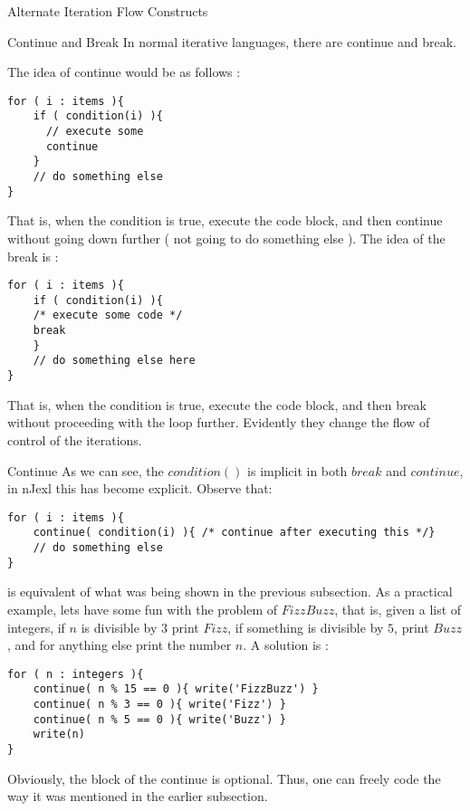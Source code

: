 \begin{section}{Alternate Iteration Flow Constructs}

\begin{subsection}{Continue and Break}
In normal iterative languages, there are continue and break.

The idea of continue would be as follows :
\begin{lstlisting}[style=JexlStyle]
for ( i : items ){
    if ( condition(i) ){
      // execute some 
      continue 
    }
    // do something else 
}
\end{lstlisting}
That is, when the condition is true, execute the code block, 
and then continue without going down further ( not going to do something else ). 
The idea of the break is :
\begin{center}\begin{minipage}{\linewidth}
\begin{lstlisting}[style=JexlStyle]
for ( i : items ){
    if ( condition(i) ){ 
    /* execute some code */  
    break 
    }
    // do something else here
}
\end{lstlisting}
\end{minipage}\end{center}

That is, when the condition is true, execute the code block, 
and then break without proceeding with the loop further. 
Evidently they change the flow of control of the iterations.
\end{subsection}

\begin{subsection}{Continue}
As we can see, the $condition()$ is implicit in both $break$ and $continue$,
in nJexl this has become explicit. Observe that:  

\begin{lstlisting}[style=JexlStyle]
for ( i : items ){
    continue( condition(i) ){ /* continue after executing this */} 
    // do something else 
}
\end{lstlisting}
is equivalent of what was being shown in the previous subsection.
As a practical example, lets have some fun with the problem of $FizzBuzz$,
that is, given a list of integers, if $n$ is divisible by $3$ print $Fizz$,
if something is divisible by $5$, print $Buzz$, and for anything else print the number $n$. 
A solution is :

\begin{lstlisting}[style=JexlStyle]
for ( n : integers ){
    continue( n % 15 == 0 ){ write('FizzBuzz') }
    continue( n % 3 == 0 ){ write('Fizz') }
    continue( n % 5 == 0 ){ write('Buzz') }
    write(n) 
}
\end{lstlisting}
Obviously, the block of the continue is optional.
Thus, one can freely code the way it was mentioned in the 
earlier subsection.
\end{subsection}



\end{section}
